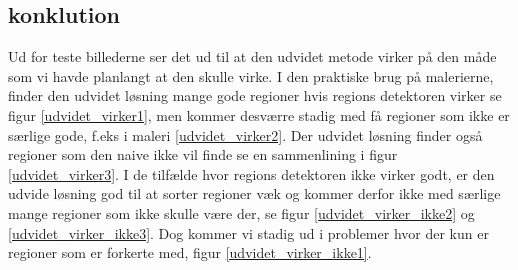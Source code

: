 \subsection{konklution}
Ud for teste billederne ser det ud til at den udvidet metode virker på
den måde som vi havde planlangt at den skulle virke. I den praktiske
brug på malerierne, finder den udvidet løsning mange gode regioner hvis
regions detektoren virker se figur \ref{udvidet_virker1}, men kommer
desværre stadig med få regioner som ikke er særlige gode, f.eks i maleri
\ref{udvidet_virker2}. Der udvidet løsning finder også regioner som den
naive ikke vil finde se en sammenlining i figur \ref{udvidet_virker3}. I
de tilfælde hvor regions detektoren ikke virker godt, er den udvide
løsning god til at sorter regioner væk og kommer derfor ikke med særlige
mange regioner som ikke skulle være der, se figur
\ref{udvidet_virker_ikke2} og \ref{udvidet_virker_ikke3}. Dog kommer vi
stadig ud i problemer hvor der kun er regioner som er forkerte med,
figur \ref{udvidet_virker_ikke1}.

